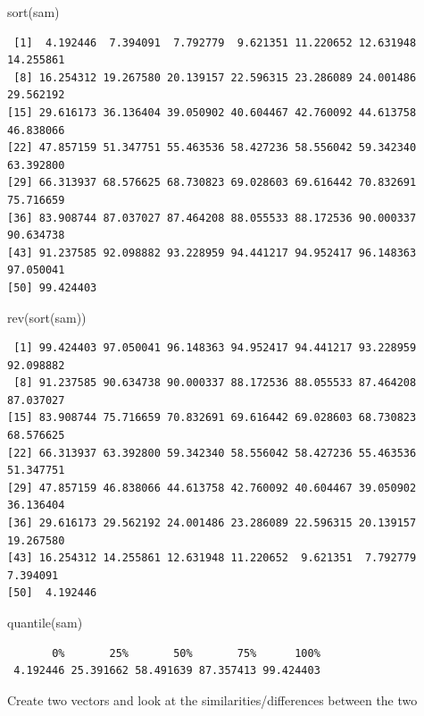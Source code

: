 \documentclass[
  letterpaper,
  DIV=11,
  numbers=noendperiod]{scrreprt}
\newenvironment{Shaded}{\begin{snugshade}}{\end{snugshade}}
\newcommand{\FunctionTok}[1]{\textcolor[rgb]{0.28,0.35,0.67}{#1}}
\newcommand{\NormalTok}[1]{\textcolor[rgb]{0.00,0.23,0.31}{#1}}
\begin{document}
\begin{Shaded}
\begin{Highlighting}[]
\FunctionTok{sort}\NormalTok{(sam)}
\end{Highlighting}
\end{Shaded}

\begin{verbatim}
 [1]  4.192446  7.394091  7.792779  9.621351 11.220652 12.631948 14.255861
 [8] 16.254312 19.267580 20.139157 22.596315 23.286089 24.001486 29.562192
[15] 29.616173 36.136404 39.050902 40.604467 42.760092 44.613758 46.838066
[22] 47.857159 51.347751 55.463536 58.427236 58.556042 59.342340 63.392800
[29] 66.313937 68.576625 68.730823 69.028603 69.616442 70.832691 75.716659
[36] 83.908744 87.037027 87.464208 88.055533 88.172536 90.000337 90.634738
[43] 91.237585 92.098882 93.228959 94.441217 94.952417 96.148363 97.050041
[50] 99.424403
\end{verbatim}

\begin{Shaded}
\begin{Highlighting}[]
\FunctionTok{rev}\NormalTok{(}\FunctionTok{sort}\NormalTok{(sam))}
\end{Highlighting}
\end{Shaded}

\begin{verbatim}
 [1] 99.424403 97.050041 96.148363 94.952417 94.441217 93.228959 92.098882
 [8] 91.237585 90.634738 90.000337 88.172536 88.055533 87.464208 87.037027
[15] 83.908744 75.716659 70.832691 69.616442 69.028603 68.730823 68.576625
[22] 66.313937 63.392800 59.342340 58.556042 58.427236 55.463536 51.347751
[29] 47.857159 46.838066 44.613758 42.760092 40.604467 39.050902 36.136404
[36] 29.616173 29.562192 24.001486 23.286089 22.596315 20.139157 19.267580
[43] 16.254312 14.255861 12.631948 11.220652  9.621351  7.792779  7.394091
[50]  4.192446
\end{verbatim}

\begin{Shaded}
\begin{Highlighting}[]
\FunctionTok{quantile}\NormalTok{(sam)}
\end{Highlighting}
\end{Shaded}

\begin{verbatim}
       0%       25%       50%       75%      100% 
 4.192446 25.391662 58.491639 87.357413 99.424403 
\end{verbatim}

Create two vectors and look at the similarities/differences between the
two
\end{document}
